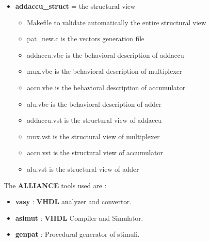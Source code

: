 \documentclass{article}
\begin{document}
{\begin{itemize}
\begin{itemize}
\item Makefile to validate automatically the entire behavioral description
\item addaccu.vbe is the behavioral description of addaccu
\item patterns.pat is the simulation patterns for addaccu
\item addaccu\_dly.vbe is the behavioral description of addaccu with delay
\item patterns\_dly.pat is the simulation patterns for addaccu with delay
\item addaccu4.vhdl is the behavioral description of addaccu using standard VHDL subset
\end{itemize}

\item {\bf addaccu\_struct} = the structural view 

\begin{itemize}
\item Makefile to validate automatically the entire structural view
\item pat\_new.c is the vectors generation file
\item addaccu.vbe is the behavioral description of addaccu
\item mux.vbe is the behavioral description of multiplexer
\item accu.vbe is the behavioral description of accumulator
\item alu.vbe is the behavioral description of adder
\item addaccu.vst is the structural view of addaccu
\item mux.vst is the structural view of multiplexer
\item accu.vst is the structural view of accumulator
\item alu.vst is the structural view of adder
\end{itemize}

\end{itemize}

The {\bf ALLIANCE} tools used are :
\begin{itemize}\itemsep=-.8ex
\item {\bf vasy} : {\bf VHDL} analyzer and convertor.
\item {\bf asimut} : {\bf VHDL} Compiler and Simulator.
\item{\bf genpat} :    Procedural generator of stimuli.
\end{itemize}

}
\end{document}
